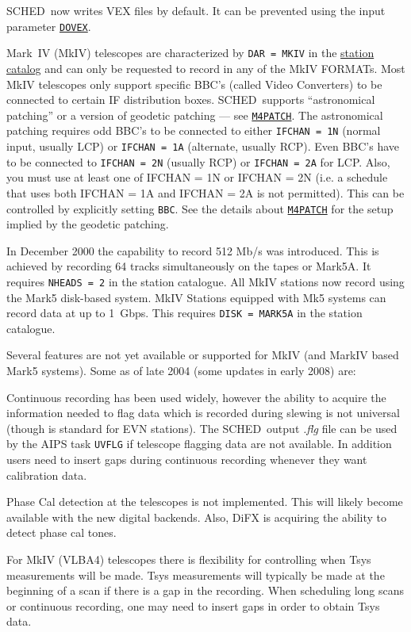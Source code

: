 \documentclass{report}
\newcommand{\schedb}{{\sc SCHED~}}
\begin{document}
\schedb now writes VEX files by default.  It can be prevented using
the input parameter 
{\hyperref[MP:DOVEX]{{\tt DOVEX}}}.

Mark~IV (MkIV) telescopes are characterized by {\tt DAR = MKIV} in the
{\hyperref[SEC:STACAT]{station catalog}} and can only be requested to
record in any of the MkIV FORMATs. Most MkIV telescopes only support
specific BBC's (called Video Converters) to be connected to certain IF
distribution boxes. \schedb supports ``astronomical patching'' or a
version of geodetic patching --- see 
{\hyperref[SP:M4PATCH]{{\tt M4PATCH}}}.
The astronomical patching requires odd BBC's to
be connected to either {\tt IFCHAN = 1N} (normal input, usually LCP)
or {\tt IFCHAN = 1A} (alternate, usually RCP). Even BBC's have to be
connected to {\tt IFCHAN = 2N} (usually RCP) or {\tt IFCHAN = 2A} for
LCP.  Also, you must use at least one of IFCHAN = 1N or IFCHAN = 2N
(i.e. a schedule that uses both IFCHAN = 1A and IFCHAN = 2A is not
permitted).  This can be controlled by explicitly setting {\tt BBC}.
See the details about 
{\hyperref[SP:M4PATCH]{{\tt M4PATCH}}} for the setup
implied by the geodetic patching.

In December 2000 the capability to record 512 Mb/s was introduced.
This is achieved by recording 64 tracks simultaneously on the tapes or
Mark5A.  It requires {\tt NHEADS = 2} in the station catalogue. All
MkIV stations now record using the Mark5 disk-based system. MkIV
Stations equipped with Mk5 systems can record data at up to
1~Gbps. This requires {\tt DISK = MARK5A} in the station catalogue.

Several features are not yet available or supported for MkIV (and MarkIV
based Mark5 systems).  Some as of late 2004 (some updates in early 2008)
are:

\begin{list}{}{\parsep 0em  \itemsep 0em }

\item Continuous recording has been used widely, however the ability
  to acquire the information needed to flag data which is recorded during
  slewing is not universal (though is standard for EVN stations).
  The \schedb output {\sl .flg} file can be used by the AIPS task
  {\tt UVFLG} if telescope flagging data are not available.  In addition
  users need to insert gaps during continuous recording whenever they
  want calibration data.

\item Phase Cal detection at the telescopes is not implemented.
  This will likely become available with the new digital backends.
  Also, DiFX is acquiring the ability to detect phase cal tones.

\item For MkIV (VLBA4) telescopes there is flexibility for controlling
  when Tsys measurements will be made. Tsys measurements will typically
  be made at the beginning of a scan if there is a gap in the recording.
  When scheduling long scans or continuous recording, one may need to
  insert gaps in order to obtain Tsys data.

\end{list}
\end{document}
